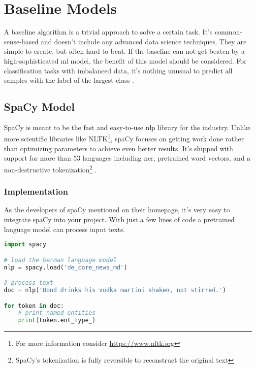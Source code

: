 \chapter{Baseline Models}

A baseline algorithm is a trivial approach to solve a certain task. It's common-sense-based and doesn't include any advanced data science techniques. They are simple to create, but often hard to beat. If the baseline can not get beaten by a high-sophisticated \acrshort{ml} model, the benefit of this model should be considered. For classification tasks with imbalanced data, it's nothing unusual to predict all samples with the label of the largest class \cite{rama18}.

\section{SpaCy Model}

SpaCy is meant to be the fast and easy-to-use \acrshort{nlp} library for the industry. Unlike more scientific libraries like NLTK\footnote{For more
information consider \url{https://www.nltk.org}}, spaCy focuses on getting work done rather than optimizing parameters to achieve even better results.
It's shipped with support for more than 53 languages including \acrlong{ner}, pretrained word vectors, and a non-destructive tokenization\footnote{
SpaCy's tokenization is fully reversible to reconstruct the original text} \cite{spacy}.

\subsection{Implementation}

As the developers of spaCy mentioned on their homepage, it's very easy to integrate spaCy into your project. With just a few lines of code a pretrained
language model can process input texts.

\begin{lstlisting}[language=Python, label={code:spacy-integration}, caption=Sample of a runnable spaCy model]
import spacy

# load the German language model
nlp = spacy.load('de_core_news_md')

# process text
doc = nlp('Bond drinks his vodka martini shaken, not stirred.')

for token in doc:
    # print named-entities
    print(token.ent_type_)
\end{lstlisting}

